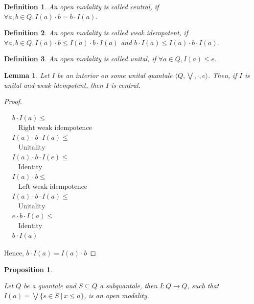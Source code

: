 \documentclass[a4paper]{article}
\newtheorem{prop}{Proposition}
\newtheorem{lemma}{Lemma}
\newtheorem{defin}{Definition}
\begin{document}
\begin{defin}
  An open modality is called central, if $\forall a, b \in Q, I(a) \cdot b = b \cdot I(a)$.
\end{defin}

\begin{defin}
  An open modality is called weak idempotent, if $\forall a, b \in Q, I(a) \cdot b \leq I(a) \cdot b \cdot I(a)$ and
  $b \cdot I(a) \leq I(a) \cdot b \cdot I(a)$.
\end{defin}

\begin{defin}
  An open modality is called unital, if $\forall a \in Q, I(a) \leq e$.
\end{defin}

\begin{lemma}
  Let $I$ be an interior on some unital quantale $\langle Q, \bigvee, \cdot, e \rangle$.
  Then, if $I$ is unital and weak idempotent, then $I$ is central.
\end{lemma}

\begin{proof}
$ $

  $\begin{array}{lll}
  & b \cdot I(a) \leq & \\
  & \:\:\:\: \text{Right weak idempotence}& \\
  &I(a) \cdot b \cdot I(a) \leq & \\
  & \:\:\:\: \text{Unitality}& \\
  & I(a) \cdot b \cdot I(e) \leq & \\
  & \:\:\:\: \text{Identity}& \\
  &I(a) \cdot b \leq & \\
  & \:\:\:\: \text{Left weak idempotence}& \\
  &I(a) \cdot b \cdot I(a) \leq & \\
  & \:\:\:\: \text{Unitality}& \\
  &e \cdot b \cdot I(a) \leq & \\
  & \:\:\:\: \text{Identity}& \\
  &b \cdot I(a)&
  \end{array}$

Hence, $b \cdot I(a) = I(a) \cdot b$

\end{proof}

\begin{prop}
$ $

  Let $Q$ be a quantale and $S \subseteq Q$ a subquantale, then $I : Q \to Q$, such that
$I(a) = \bigvee \{ s \in S \: | \: x \leq a \}$, is an open modality.
\end{prop}
\end{document}
